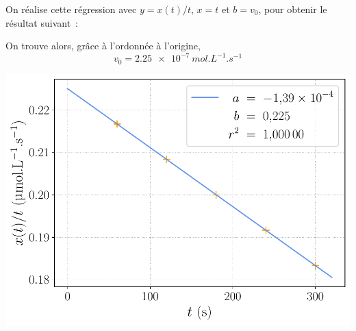 \documentclass[../../main/main.tex]{subfiles}
\begin{document}
{  On réalise cette régression avec $y = x(t)/t$, $x = t$ et $b = v_0$,
  pour obtenir le résultat suivant~:
  \begin{minipage}{0.45\linewidth}
      On trouve alors, grâce à l'ordonnée à l'origine,
      \[\boxed{v_0 = \SI{2.25e-7}{mol.L^{-1}.s^{-1}}}\]
  \end{minipage}
  \begin{minipage}{0.55\linewidth}
      \begin{center}
          \includegraphics[width=\linewidth]{exo3_xtt}
      \end{center}
  \end{minipage}
}
\end{document}
